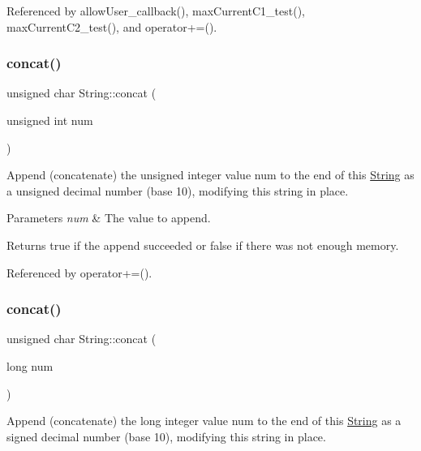 Referenced by allow\+User\+\_\+callback(), max\+Current\+C1\+\_\+test(), max\+Current\+C2\+\_\+test(), and operator+=().

\mbox{\label{class_string_af9c20f944d8a4687808017388047d155}} 
\subsubsection{\texorpdfstring{concat()}{concat()}\hspace{0.1cm}{\footnotesize\ttfamily [7/12]}}
{\footnotesize\ttfamily unsigned char String\+::concat (\begin{DoxyParamCaption}\item[{unsigned int}]{num }\end{DoxyParamCaption})}



Append (concatenate) the unsigned integer value num to the end of this \hyperlink{class_string}{String} as a unsigned decimal number (base 10), modifying this string in place. 


\begin{DoxyParams}{Parameters}
{\em num} & The value to append.\\
\hline
\end{DoxyParams}
\begin{DoxyReturn}{Returns}
true if the append succeeded or false if there was not enough memory. 
\end{DoxyReturn}


Referenced by operator+=().

\mbox{\label{class_string_a92a456f8679a19d2221ec43841238ead}} 
\subsubsection{\texorpdfstring{concat()}{concat()}\hspace{0.1cm}{\footnotesize\ttfamily [8/12]}}
{\footnotesize\ttfamily unsigned char String\+::concat (\begin{DoxyParamCaption}\item[{long}]{num }\end{DoxyParamCaption})}



Append (concatenate) the long integer value num to the end of this \hyperlink{class_string}{String} as a signed decimal number (base 10), modifying this string in place. 


